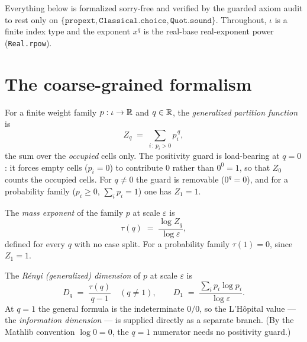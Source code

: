Everything below is formalized sorry-free and verified by the guarded axiom audit to rest only on
\(\{\texttt{propext}, \texttt{Classical.choice}, \texttt{Quot.sound}\}\). Throughout, \(\iota\) is
a finite index type and the exponent \(x^q\) is the real-base real-exponent power
(\texttt{Real.rpow}).

\section{The coarse-grained formalism}

\begin{definition}\label{partitionFunction}
  \leanok
  For a finite weight family \(p : \iota \to \mathbb{R}\) and \(q \in \mathbb{R}\), the \emph{generalized
  partition function} is
  \[
    Z_q \;=\; \sum_{i \,:\, p_i > 0} p_i^{\,q},
  \]
  the sum over the \emph{occupied} cells only. The positivity guard is load-bearing at
  \(q = 0\): it forces empty cells (\(p_i = 0\)) to contribute \(0\) rather than
  \(0^0 = 1\), so that \(Z_0\) counts the occupied cells. For \(q \ne 0\) the guard is removable
  (\(0^q = 0\)), and for a probability family (\(p_i \ge 0\), \(\sum_i p_i = 1\)) one has
  \(Z_1 = 1\).
\end{definition}

\begin{definition}\label{massExponent}
  \leanok
  The \emph{mass exponent} of the family \(p\) at scale \(\varepsilon\) is
  \[
    \tau(q) \;=\; \frac{\log Z_q}{\log \varepsilon},
  \]
  defined for every \(q\) with no case split. For a probability family \(\tau(1) = 0\), since
  \(Z_1 = 1\).
\end{definition}

\begin{definition}\label{renyiDim}
  \leanok
  The \emph{R\'enyi (generalized) dimension} of \(p\) at scale \(\varepsilon\) is
  \[
    D_q \;=\; \frac{\tau(q)}{q - 1} \quad (q \ne 1), \qquad
    D_1 \;=\; \frac{\sum_i p_i \log p_i}{\log \varepsilon}.
  \]
  At \(q = 1\) the general formula is the indeterminate \(0/0\), so the L'H\^opital value --- the
  \emph{information dimension} --- is supplied directly as a separate branch. (By the Mathlib
  convention \(\log 0 = 0\), the \(q = 1\) numerator needs no positivity guard.)
\end{definition}


